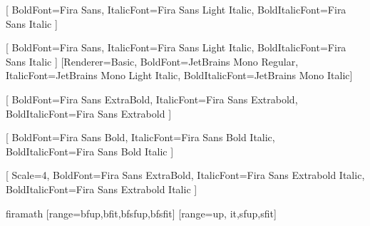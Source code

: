 \RequirePackage{microtype}
\RequirePackage{polyglossia}
\setdefaultlanguage{french}
\RequirePackage{fontspec}
\RequirePackage{amssymb}

[
  BoldFont={Fira Sans},
  ItalicFont={Fira Sans Light Italic},
  BoldItalicFont={Fira Sans Italic}
]

\setsansfont{Fira Sans Light}[
  BoldFont={Fira Sans},
  ItalicFont={Fira Sans Light Italic},
  BoldItalicFont={Fira Sans Italic}
]
\setmonofont{JetBrains Mono Light}[Renderer=Basic,
  BoldFont={JetBrains Mono Regular},
  ItalicFont={JetBrains Mono Light Italic},
  BoldItalicFont={JetBrains Mono Italic}]%

[
  BoldFont={Fira Sans ExtraBold},
  ItalicFont={Fira Sans Extrabold},
  BoldItalicFont={Fira Sans Extrabold}
]

[
  BoldFont={Fira Sans Bold},
  ItalicFont={Fira Sans Bold Italic},
  BoldItalicFont={Fira Sans Bold Italic}
]

[
  Scale=4,
  BoldFont={Fira Sans ExtraBold},
  ItalicFont={Fira Sans Extrabold Italic},
  BoldItalicFont={Fira Sans Extrabold Italic}
]

\ifcsname firamath\endcsname%
\RequirePackage[math-style=french]{unicode-math}
[range={bfup,bfit,bfsfup,bfsfit}] %
[range={up, it,sfup,sfit}]
\fi

